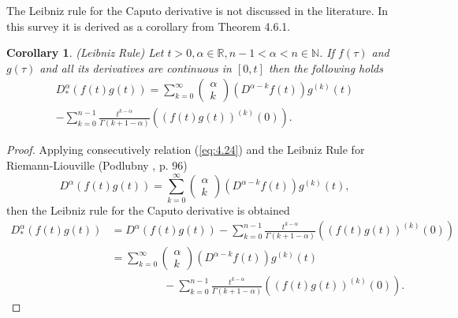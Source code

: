 \documentclass[a4paper,14pt,oneside]{book}
\theoremstyle{plain}
\newtheorem{cor}{Corollary}[thm]
\theoremstyle{definition}
\theoremstyle{remark}
\begin{document}
\begin{center}
\begin{flushleft}
{The Leibniz rule for the Caputo derivative is not discussed in the literature. In this survey it is derived as a corollary from Theorem 4.6.1. 

\begin{cor}(Leibniz Rule) Let $t>0, \alpha \in \mathbb{R}, n-1<\alpha<n \in \mathbb{N}$. If $f(\tau)$ and $g(\tau)$ and all its derivatives are continuous in $[0, t]$ then the following holds
\begin{equation}\label{eq:4.25}
\begin{aligned}
D_{*}^{\alpha}(f(t) g(t))=\sum_{k=0}^{\infty}\left(\begin{array}{c}
\alpha \\k\end{array}\right)\left(D^{\alpha-k} f(t)\right) g^{(k)}(t)\\-\sum_{k=0}^{n-1} \frac{t^{k-\alpha}}{\Gamma(k+1-\alpha)}\left((f(t) g(t))^{(k)}(0)\right) .
\end{aligned}
\end{equation}
\end{cor}
\begin{proof}
Applying consecutively relation (\ref{eq:4.24}) and the Leibniz Rule for Riemann-Liouville (Podlubny \cite{bb22}, p. 96)
$$
D^{\alpha}(f(t) g(t))=\sum_{k=0}^{\infty}\left(\begin{array}{l}
\alpha \\
k
\end{array}\right)\left(D^{\alpha-k} f(t)\right) g^{(k)}(t),
$$
then the Leibniz rule for the Caputo derivative is obtained
$$
\begin{aligned}
D_{*}^{\alpha}(f(t) g(t)) &=D^{\alpha}(f(t) g(t))-\sum_{k=0}^{n-1} \frac{t^{k-\alpha}}{\Gamma(k+1-\alpha)}\left((f(t) g(t))^{(k)}(0)\right) \\
&=\sum_{k=0}^{\infty}\left(\begin{array}{c}
\alpha \\k \end{array}\right)\left(D^{\alpha-k} f(t)\right) g^{(k)}(t) \\ & \hspace{2cm} -\sum_{k=0}^{n-1} \frac{t^{k-\alpha}}{\Gamma(k+1-\alpha)}\left((f(t) g(t))^{(k)}(0)\right) .
\end{aligned}
$$
\end{proof}}
\end{flushleft}
        \end{center}
\end{document}
